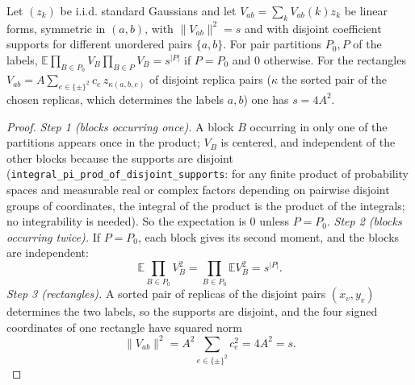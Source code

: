 \begin{lemma}\label{lem:sg-tal:hanen-gaussian-pairings}
\leanok
{}
Let $(z_k)$ be i.i.d. standard Gaussians and let $V_{ab}=\sum_k V_{ab}(k)z_k$ be linear forms, symmetric in $(a,b)$,
with $\|V_{ab}\|^2=s$ and with disjoint coefficient supports for different unordered pairs $\{a,b\}$.
For pair partitions $P_0,P$ of the labels, $\mathbb E\prod_{B\in P_0}V_B\prod_{B\in P}V_B=s^{|P|}$ if $P=P_0$ and $0$ otherwise.
For the rectangles $V_{ab}=A\sum_{e\in\{\pm\}^2}c_e\,z_{\kappa(a,b,e)}$ of disjoint replica pairs ($\kappa$ the sorted pair of the chosen replicas,
which determines the labels $a,b$) one has $s=4A^2$.
\end{lemma}
\begin{proof}
\leanok
\emph{Step 1 (blocks occurring once).} A block $B$ occurring in only one of the partitions appears once in the product; $V_B$ is centered, and independent of the other blocks because the supports are disjoint (\texttt{integral\_pi\_prod\_of\_disjoint\_supports}: for any finite product of probability spaces and measurable real or complex factors depending on pairwise disjoint groups of coordinates, the integral of the product is the product of the integrals; no integrability is needed). So the expectation is $0$ unless $P=P_0$.
\emph{Step 2 (blocks occurring twice).} If $P=P_0$, each block gives its second moment, and the blocks are independent:
\[
\mathbb E\prod_{B\in P_0}V_B^2=\prod_{B\in P_0}\mathbb EV_B^2=s^{|P|}.
\]
\emph{Step 3 (rectangles).} A sorted pair of replicas of the disjoint pairs $(x_v,y_v)$ determines the two labels, so the supports are disjoint, and the four signed coordinates of one rectangle have squared norm
\[
\|V_{ab}\|^2=A^2\sum_{e\in\{\pm\}^2}c_e^2=4A^2=s .
\]
\end{proof}

